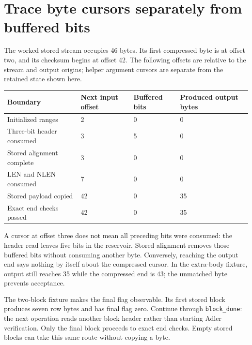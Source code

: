 \section{Trace byte cursors separately from buffered bits}
The worked stored stream occupies 46 bytes. Its first compressed byte is at offset
two, and its checksum begins at offset 42. The following offsets are relative to the
stream and output origins; helper argument cursors are separate from the retained
state shown here.

\begin{longtable}{p{48mm}p{29mm}p{30mm}p{35mm}}
  \toprule Boundary         & Next input offset & Buffered bits & Produced output bytes \\\midrule
  Initialized ranges        & 2                 & 0             & 0                     \\
  Three-bit header consumed & 3                 & 5             & 0                     \\
  Stored alignment complete & 3                 & 0             & 0                     \\
  LEN and NLEN consumed     & 7                 & 0             & 0                     \\
  Stored payload copied     & 42                & 0             & 35                    \\
  Exact end checks passed   & 42                & 0             & 35                    \\\bottomrule
\end{longtable}
A cursor at offset three does not mean all preceding bits were consumed: the header
read leaves five bits in the reservoir. Stored alignment removes those buffered bits
without consuming another byte. Conversely, reaching the output end says nothing by
itself about the compressed cursor. In the extra-body fixture, output still reaches
35 while the compressed end is 43; the unmatched byte prevents acceptance.

The two-block fixture makes the final flag observable. Its first stored block produces
seven row bytes and has final flag zero. Continue through \texttt{block\_done}: the
next operation reads another block header rather than starting Adler verification.
Only the final block proceeds to exact end checks. Empty stored blocks can take this
same route without copying a byte.
